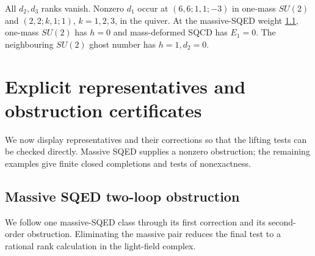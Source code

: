 \documentclass[11pt]{article}
\numberwithin{equation}{section}
\numberwithin{figure}{section}
\numberwithin{table}{section}
\begin{document}
All $d_2,d_3$ ranks vanish. Nonzero $d_1$ occur at $(6,6;1,1;-3)$ in one-mass $SU(2)$ and $(2,2;k,1;1)$, $k=1,2,3$, in the quiver. At the massive-SQED weight \ref{sec-SQEDlift}, one-mass $SU(2)$ has $h=0$ and mass-deformed SQCD has $E_1=0$. The neighbouring $SU(2)$ ghost number has $h=1,d_2=0$.

\section{Explicit representatives and obstruction certificates}\label{sec-E-explicit-representatives}

We now display representatives and their corrections so that the lifting tests can be checked directly. Massive SQED supplies a nonzero obstruction; the remaining examples give finite closed completions and tests of nonexactness.

\subsection{Massive SQED two-loop obstruction}\label{sec-SQEDlift}

We follow one massive-SQED class through its first correction and its second-order obstruction. Eliminating the massive pair reduces the final test to a rational rank calculation in the light-field complex.
\end{document}
